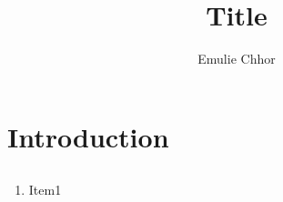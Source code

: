 \documentclass{article}
\begin{document}
\title{Title}
\author{Emulie Chhor}
\maketitle

\section{Introduction}

\subsection{}

    \begin{enumerate}
	\item Item1
    \end{enumerate}
\end{document}
